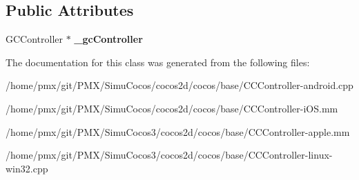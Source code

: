 \subsection*{Public Attributes}
\begin{DoxyCompactItemize}
\item 
\mbox{\label{classControllerImpl_a5659b8ed0cb6bf83aa30bb06b8596b8c}} 
G\+C\+Controller $\ast$ {\bfseries \+\_\+gc\+Controller}
\end{DoxyCompactItemize}


The documentation for this class was generated from the following files\+:\begin{DoxyCompactItemize}
\item 
/home/pmx/git/\+P\+M\+X/\+Simu\+Cocos/cocos2d/cocos/base/C\+C\+Controller-\/android.\+cpp\item 
/home/pmx/git/\+P\+M\+X/\+Simu\+Cocos/cocos2d/cocos/base/C\+C\+Controller-\/i\+O\+S.\+mm\item 
/home/pmx/git/\+P\+M\+X/\+Simu\+Cocos3/cocos2d/cocos/base/C\+C\+Controller-\/apple.\+mm\item 
/home/pmx/git/\+P\+M\+X/\+Simu\+Cocos3/cocos2d/cocos/base/C\+C\+Controller-\/linux-\/win32.\+cpp\end{DoxyCompactItemize}
